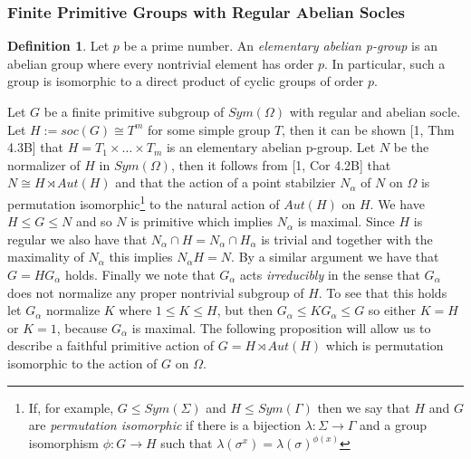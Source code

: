 \documentclass[]{article}
\theoremstyle{definition}
\newtheorem{defn}[thm]{Definition}
\begin{document}
\subsubsection{Finite Primitive Groups with Regular Abelian Socles}
\begin{defn}
	Let $p$ be a prime number. An \emph{elementary abelian p-group} is an abelian group where every nontrivial element has order $p$. In particular, such a group is isomorphic to a direct product of cyclic groups of order $p$.
\end{defn}

Let $G$ be a finite primitive subgroup of $Sym(\Omega)$ with regular and abelian socle. Let $H:=soc(G) \cong T^m$ for some simple group $T$, then it can be shown [1, Thm 4.3B] that $H=T_1 \times \dots \times T_m$ is an elementary abelian p-group. Let $N$ be the normalizer of $H$ in $Sym(\Omega)$, then it follows from [1, Cor 4.2B] that $N \cong H \rtimes Aut(H)$ and that the action of a point stabilzier $N_\alpha$ of $N$ on $\Omega$ is permutation isomorphic\footnote{If, for example, $G \leqslant Sym(\Sigma)$ and $H \leqslant Sym(\Gamma)$ then we say that $H$ and $G$ are \emph{permutation isomorphic} if there is a bijection $\lambda:\Sigma \rightarrow \Gamma$ and a group isomorphism $\phi:G \rightarrow H$ such that $\lambda(\sigma^x)=\lambda(\sigma)^{\phi(x)}$} to the natural action of $Aut(H)$ on $H$. We have $H \leqslant G \leqslant N$ and so $N$ is primitive which implies $N_\alpha$ is maximal. Since $H$ is regular we also have that $N_\alpha \cap H = N_\alpha \cap H_\alpha$ is trivial and together with the maximality of $N_\alpha$ this implies $N_\alpha H = N$. By a similar argument we have that $G=H G_\alpha$ holds. Finally we note that $G_\alpha$ acts \emph{irreducibly} in the sense that $G_\alpha$ does not normalize any proper nontrivial subgroup of $H$. To see that this holds let $G_\alpha$ normalize $K$ where $1 \leqslant K \leqslant H$, but then $G_\alpha \leqslant KG_\alpha \leqslant G$ so either $K=H$ or $K=1$, because $G_\alpha$ is maximal. The following proposition will allow us to describe a faithful primitive action of $G= H \rtimes Aut(H)$ which is permutation isomorphic to the action of $G$ on $\Omega$.
\end{document}
